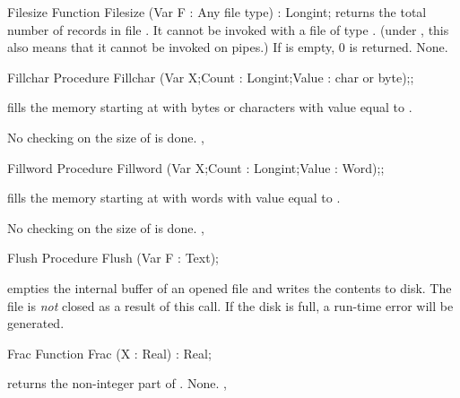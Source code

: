 \documentclass{report}
\begin{document}

\begin{function}{Filesize}
\Declaration
Function Filesize (Var F : Any file type) : Longint;
\Description
{} returns the total number of records in file .
It cannot be invoked with a file of type . (under \linux, this
also means that it cannot be invoked on pipes.)
If  is empty, 0 is returned.
\Errors
None.
\SeeAlso
{}
\end{function}


\begin{procedure}{Fillchar}
\Declaration
Procedure Fillchar (Var X;Count : Longint;Value : char or byte);;

\Description
{} fills the memory starting at  with  bytes
or characters with value equal to .

\Errors
No checking on the size of  is done.
\SeeAlso
{}, 
\end{procedure}


\begin{procedure}{Fillword}
\Declaration
Procedure Fillword (Var X;Count : Longint;Value : Word);;

\Description
{} fills the memory starting at  with  words
with value equal to .

\Errors
No checking on the size of  is done.
\SeeAlso
{}, 
\end{procedure}


\begin{procedure}{Flush}
\Declaration
Procedure Flush (Var F : Text);

\Description
{} empties the internal buffer of an opened file  and writes the
contents to disk. The file is \textit{not} closed as a result of this call.
\Errors
If the disk is full, a run-time error will be generated.
\SeeAlso
{}
\end{procedure}


\begin{function}{Frac}
\Declaration
Function Frac (X : Real) : Real;

\Description
{} returns the non-integer part of .
\Errors
None.
\SeeAlso
{}, 
\end{function}
\end{document}
